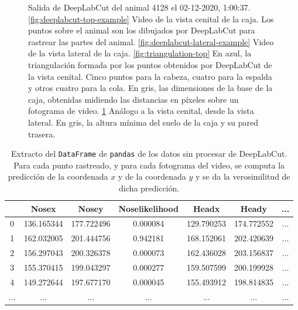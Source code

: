 \begin{figure}[]
\begin{subfigure}{0.45\textwidth}
    \caption{}
    \label{fig:triangulation-lateral}
  \end{subfigure}
  \caption[Salida de DeepLabCut.]
  {Salida de DeepLabCut del animal 4128 el 02-12-2020, 1:00:37. \ref{fig:deeplabcut-top-example} Video de la vista cenital de la caja. Los puntos sobre el animal son los dibujados por DeepLabCut para rastrear las partes del animal. \ref{fig:deeplabcut-lateral-example} Video de la vista lateral de la caja. \ref{fig:triangulation-top} En azul, la triangulación formada por los puntos obtenidos por DeepLabCut de la vista cenital. Cinco puntos para la cabeza, cuatro para la espalda y otros cuatro para la cola. En gris, las dimensiones de la base de la caja, obtenidas midiendo las distancias en píxeles sobre un fotograma de video. \ref{fig:triangulation-lateral} Análogo a la vista cenital, desde la vista lateral. En gris, la altura mínima del suelo de la caja y su pared trasera.}

  \label{fig:deeplabcut-outputexamples}
\end{figure}

\begin{table}[h]
  \centering
  \begin{tabular}{|c|c|c|c|c|c|c|}
  \hline
    & Nosex & Nosey & Noselikelihood & Headx & Heady & ... \\
  \hline
  0 & 136.165344 & 177.722496 & 0.000084 & 129.790253 & 174.772552 & ... \\
  1 & 162.032005 & 201.444756 & 0.942181 & 168.152061 & 202.420639 & ... \\
  2 & 156.297043 & 200.326378 & 0.000073 & 162.436028 & 203.156837 & ... \\
  3 & 155.370415 & 199.043297 & 0.000277 & 159.507599 & 200.199928 & ... \\
  4 & 149.272644 & 197.677170 & 0.000045 & 155.493912 & 198.814835 & ... \\
  ... & ... & ... & ... & ... & ... & ... \\
  \hline
  \end{tabular}
  \caption[Datos de DeepLabCut]{Extracto del \texttt{DataFrame} de \texttt{pandas} de los datos sin procesar de DeepLabCut. Para cada punto rastreado, y para cada fotograma del video, se computa la predicción de la coordenada $x$ y de la coordenada $y$ y se da la verosimilitud de dicha predicción.}
  \label{tab:df-example}
\end{table}

